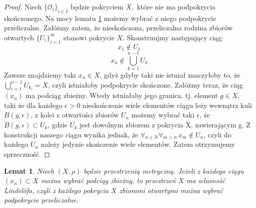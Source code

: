 \documentclass[licencjacka]{pwr_wmat_praca_dyplomowa}
\theoremstyle{plain}
\numberwithin{theorem}{chapter}
\newtheorem{lemma}[theorem]{Lemat}
\theoremstyle{definition}
\numberwithin{theorem}{chapter}
\begin{document}
\begin{proof}
Niech $\{\mathcal{O}_i\}_{i \in I}$ będzie pokryciem $X,$ które nie ma podpokrycia skończonego. Na mocy lematu \ref{z_kazdego_pokrycia_mozna_wybrac_podpokrycie_przeliczalne} możemy wybrać z niego podpokrycie przeliczalne.
Załóżmy zatem, że nieskończona, przeliczalna rodzina zbiorów otwartych $\{U_i\}_{i=1}^{\infty}$ stanowi pokrycie $X$. Skonstruujmy następujący ciąg: 
$$x_1 \notin U_1$$
$$x_n \notin \bigcup_{k=1}^{n-1} U_k$$ Zawsze znajdziemy taki $x_n \in X$, gdyż gdyby taki nie istniał znaczyłoby to, że $\bigcup_{i=1}^{n-1}{U_{k_i}} = X$, czyli istniałoby podpokrycie skończone. Załóżmy teraz, że ciąg $(x_n)$ ma podciąg zbieżny. Wtedy istniałaby jego granica, tj. element $g \in X,$ taki że dla każdego $\epsilon > 0$ nieskończenie wiele elementów ciągu leży wewnątrz kuli $B(g, \epsilon)$, z kolei z otwartości zbiorów $U_n$ możemy wybrać taki $\epsilon$, że $B(g, \epsilon) \subset U_k$, gdzie $U_k$ jest dowolnym zbiorem z pokrycia X, zawierającym g. Z konstrukcji naszego ciągu wynika jednak, że $\forall_{n \in N} \forall_{m>n} \, x_m \notin U_n$, czyli do każdego $U_n$ należy jedynie skończenie wiele elementów. Zatem otrzymujemy sprzeczność.
\end{proof}


\begin{lemma}
\label{z_kazdego_pokrycia_mozna_wybrac_podpokrycie_przeliczalne}
Niech $(X, \rho)$ będzie przestrzenią metryczną. Jeżeli z każdego ciągu $(x_n) \subset X$ można wybrać podciąg zbieżny, to przestrzeń $X$ ma własność Lindel\"ofa, czyli z każdego pokrycia $X$ zbiorami otwartymi można wybrać podpokrycie przeliczalne.
\end{lemma}
\end{document}
